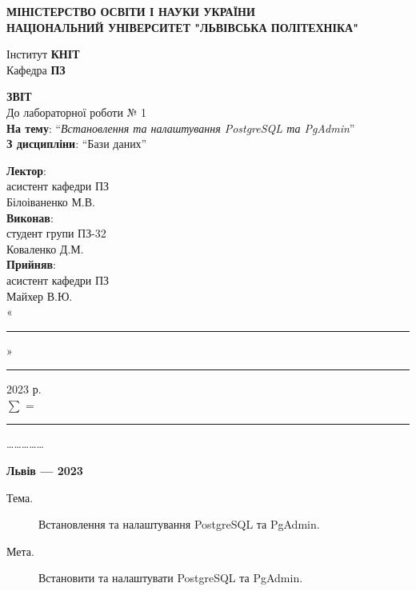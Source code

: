 \documentclass[14pt]{extreport}
\newcommand\subject{Бази даних}
\newcommand\lecturer{асистент кафедри ПЗ\\Білоіваненко М.В.}
\newcommand\teacher{асистент кафедри ПЗ\\Майхер В.Ю.}
\newcommand\mygroup{ПЗ-32}
\newcommand\lab{1}
\newcommand\theme{Встановлення та налаштування PostgreSQL та PgAdmin}
\newcommand\purpose{Встановити та налаштувати PostgreSQL та PgAdmin}
\begin{document}
\begin{normalsize}
	\begin{titlepage}
		\thispagestyle{empty}
		\begin{center}
			\textbf{МІНІСТЕРСТВО ОСВІТИ І НАУКИ УКРАЇНИ\\
				НАЦІОНАЛЬНИЙ УНІВЕРСИТЕТ "ЛЬВІВСЬКА ПОЛІТЕХНІКА"}
		\end{center}
		\begin{flushright}
			Інститут \textbf{КНІТ}\\
			Кафедра \textbf{ПЗ}
		\end{flushright}
		\vspace{200pt}
		\begin{center}
			\textbf{ЗВІТ}\\
			\vspace{10pt}
			До лабораторної роботи № \lab\\
			\textbf{На тему}: “\textit{\theme}”\\
			\textbf{З дисципліни}: “\subject”
		\end{center}
		\vspace{40pt}
		\begin{flushright}
			
			\textbf{Лектор}:\\
			\lecturer\\
			\vspace{10pt}
			\textbf{Виконав}:\\
			
			студент групи \mygroup\\
			Коваленко Д.М.\\
			\vspace{10pt}
			\textbf{Прийняв}:\\
			
			\teacher\\
			
			\vspace{28pt}
			«\rule{1cm}{0.15mm}» \rule{1.5cm}{0.15mm} 2023 р.\\
			$\sum$ = \rule{1cm}{0.15mm}……………\\
			
		\end{flushright}
		\vspace{\fill}
		\begin{center}
			\textbf{Львів — 2023}
		\end{center}
	\end{titlepage}
		
	\begin{description}
		\item[Тема.] \theme.
		\item[Мета.] \purpose.
	\end{description}


\end{normalsize}
\end{document}

